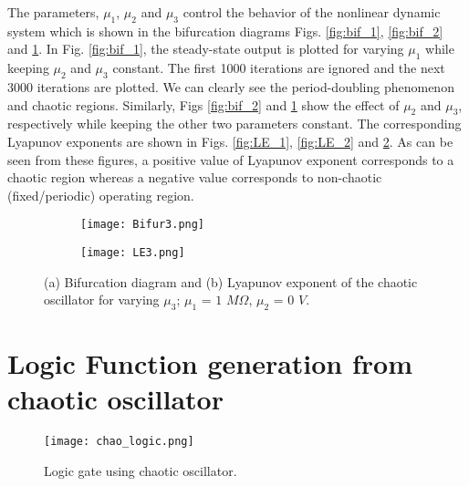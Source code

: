 \documentclass[conference]{IEEEtran}
\begin{document}
The parameters, $\mu_1$, $\mu_2$ and $\mu_3$ control the behavior of the nonlinear dynamic system which is shown in the bifurcation diagrams  Figs. \ref {fig:bif_1}, \ref {fig:bif_2} and \ref {fig:bif_3}. In Fig. \ref{fig:bif_1}, the steady-state output is plotted for varying $\mu_1$ while keeping $\mu_2$ and $\mu_3$ constant. The first 1000 iterations are ignored and the next 3000 iterations are plotted. We can clearly see the period-doubling phenomenon and chaotic regions. Similarly, Figs \ref {fig:bif_2} and \ref {fig:bif_3} show the effect of $\mu_2$ and $\mu_3$, respectively while keeping the other two parameters constant. The corresponding Lyapunov exponents are shown in Figs. \ref {fig:LE_1}, \ref {fig:LE_2} and \ref {fig:LE_3}. As can be seen from these figures, a positive value of Lyapunov exponent corresponds to a chaotic region whereas a negative value corresponds to  non-chaotic (fixed/periodic) operating region. 
\begin{figure}
    \centering
     \begin{subfigure}[b]{0.4\textwidth}
       \texttt{[image: Bifur3.png]}
        \caption{}
        \label{fig:bif_3}
    \end{subfigure}
    \begin{subfigure}[b]{0.4\textwidth}
      \texttt{[image: LE3.png]}
        \caption{}
        \label{fig:LE_3}
    \end{subfigure}
    
    \caption{\small{(a) Bifurcation diagram and (b) Lyapunov exponent of the chaotic oscillator for varying $\mu_3$; $\mu_1$ = $1$ $M\Omega$,  $\mu_2$ = $0$ $V$.} }
 \label{bif_mu3}
\end{figure}

\section{Logic Function generation from chaotic oscillator}
\label{sec_logic}


  
\begin{figure}
\centering
\texttt{[image: chao\_logic.png]}
\caption{\small{Logic gate using chaotic oscillator.}}
\label{chao_logic}
\end{figure}
\end{document}
